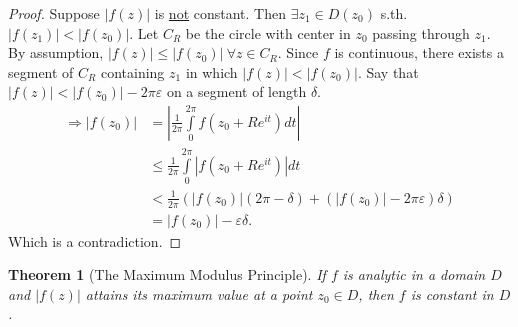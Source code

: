 \documentclass[12pt, a4paper]{article}
\theoremstyle{plain}
\newtheorem{thm}{Theorem} %
\theoremstyle{definition}
\begin{document}
			\begin{proof}
				Suppose $|f(z)|$ is \underline{not} constant. Then $\exists z_1\in D(z_0)$ s.th. $|f(z_1)|<|f(z_0)|$. Let $C_R$ be the circle with center in $z_0$ passing through $z_1$. By assumption, $|f(z)|\le |f(z_0)|\:\forall z\in C_R$. Since $f$ is continuous, there exists a segment of $C_R$ containing $z_1$ in which $|f(z)|<|f(z_0)|$. Say that $|f(z)|<|f(z_0)|-2\pi \varepsilon$ on a segment of length $\delta$.
				\begin{align*}
					\Rightarrow |f(z_0)| &= \left|\frac{1}{2\pi}\int\limits_{0}^{2\pi}f(z_0+Re^{it})dt\right|
					\tag*{By the mean-value-property}\\ &\le
					\frac{1}{2\pi}\int\limits_{0}^{2\pi}|f(z_0+Re^{it})|dt\\ &< 
					\frac{1}{2\pi}\left(|f(z_0)|(2\pi- \delta)+(|f(z_0)|-2\pi \varepsilon)\delta\right)\\ &=
					|f(z_0)|-\varepsilon \delta.
				\end{align*}
				Which is a contradiction.
			\end{proof}
			\begin{thm}[The Maximum Modulus Principle]
				If $f$ is analytic in a domain $D$ and $|f(z)|$ attains its maximum value at a point $z_0\in D$, then $f$ is constant in $D$.
			\end{thm}
\end{document}
